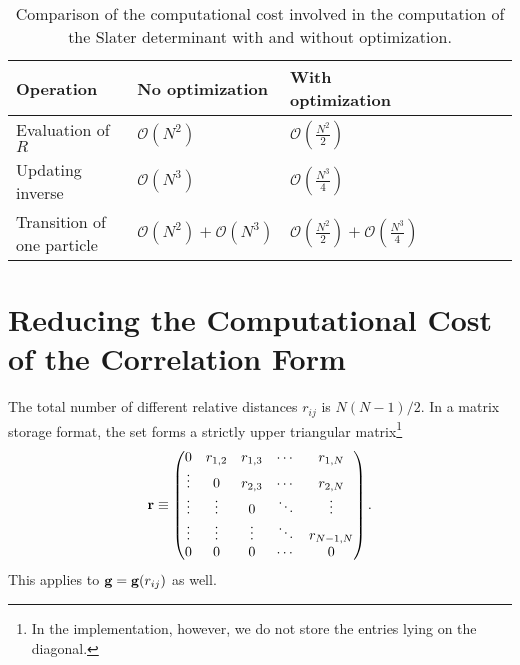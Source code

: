 \begin{table}
\centering
\begin{tabular}{l*{6}{l}l}
\hline
Operation       & No optimization & With optimization\\
\hline
Evaluation of $R$    & $\mathcal{O}(N^2)$ & $\mathcal{O}\left(\frac{N^2}{2}\right)$\\
Updating inverse& $\mathcal{O}(N^3)$ & $\mathcal{O}\left(\frac{N^3}{4}\right)$  \\
Transition of one particle & $\mathcal{O}(N^2) +  \mathcal{O}(N^3)$ & $\mathcal{O}\left(\frac{N^2}{2}\right) + \mathcal{O}\left(\frac{N^3}{4}\right)$\\
\hline
\end{tabular}
\caption{Comparison of the computational cost involved in the computation of  
the Slater determinant with and without optimization.}
\label{performance}
\end{table}


\section{Reducing the Computational Cost of the Correlation Form}\label{optimizingCorrelation}
The total number of different relative distances $r_{ij}$ is $N(N-1)/2$. In a matrix storage format, the set forms a strictly upper triangular matrix\footnote{In the implementation, however, we do not store the entries lying on the diagonal.}
\begin{equation}\label{utrij}
 {\bf r} \equiv \begin{pmatrix}
  0 & r_{1,2} & r_{1,3} & \cdots & r_{1,N} \\
  \vdots & 0       & r_{2,3} & \cdots & r_{2,N} \\
  \vdots & \vdots  & 0  & \ddots & \vdots  \\
  \vdots & \vdots  & \vdots  & \ddots  & r_{N-1,N} \\
  0 & 0  & 0  & \cdots  & 0
 \end{pmatrix}.
\end{equation}
This applies to  ${\bf g} = {\bf g}(r_{ij})$ as well. 
